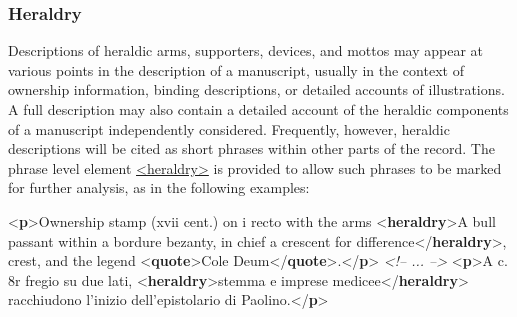 \subsubsection[{Heraldry}]{Heraldry}\label{mshera}\par
Descriptions of heraldic arms, supporters, devices, and mottos may appear at various points in the description of a manuscript, usually in the context of ownership information, binding descriptions, or detailed accounts of illustrations. A full description may also contain a detailed account of the heraldic components of a manuscript independently considered. Frequently, however, heraldic descriptions will be cited as short phrases within other parts of the record. The phrase level element \hyperref[TEI.heraldry]{<heraldry>} is provided to allow such phrases to be marked for further analysis, as in the following examples: \par\bgroup{}\exampleFont \begin{shaded}\noindent\mbox{}{<\textbf{p}>}Ownership stamp (xvii cent.) on i recto with the arms {<\textbf{heraldry}>}A bull\mbox{}\newline 
\hspace*{1em}\hspace*{1em} passant within a bordure bezanty, in chief a crescent for difference{</\textbf{heraldry}>}\mbox{}\newline 
 [Cole], crest, and the legend {<\textbf{quote}>}Cole Deum{</\textbf{quote}>}.{</\textbf{p}>}\mbox{}\newline 
\textit{<!-- ... -->}\mbox{}\newline 
{<\textbf{p}>}A c. 8r fregio su due lati, {<\textbf{heraldry}>}stemma e imprese medicee{</\textbf{heraldry}>}\mbox{}\newline 
 racchiudono l'inizio dell'epistolario di Paolino.{</\textbf{p}>}\end{shaded}\egroup\par 
